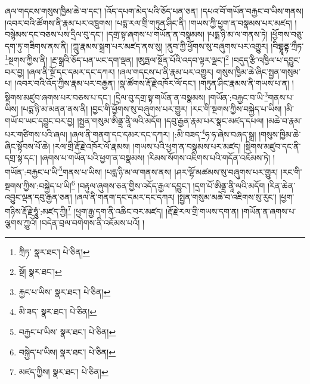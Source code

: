 ཞལ་གདངས་གསུས་ཁྱིམ་ཆེ་བ་དང་། །འོད་དཔག་མེད་པའི་ཅོད་པན་ཅན། །དཔའ་བོ་གཡོན་བརྐྱང་བ་ཡིས་གནས། །འབར་བའི་ཚོགས་ནི་རྣམ་པར་འཁྲུགས། །པདྨ་རལ་གྲི་གཏུན་ཤིང་ནི། །གཡས་ཀྱི་ཕྱག་ན་བསྣམས་པར་མཛད། །བསྙེམས་དང་བཅས་པས་དྲིལ་བུ་དང་། །དགྲ་སྟ་ཞགས་པ་གཡོན་ན་བསྣམས། །པདྨ་ཉི་མ་ལ་གནས་ཏེ། །ཕྱོགས་བཅུ་དག་ཏུ་གཟིགས་ནས་ནི། །ཀླུ་རྣམས་སྐྲག་པར་མཛད་ནས་སུ། །ནུབ་ཀྱི་ཕྱོགས་སུ་བཞུགས་པར་འགྱུར། །བིགྷྣཱནྟ་ཀྲྀཏ་\footnote{ཀྲིཏ་  སྣར་ཐང་།  པེ་ཅིན། }སྔགས་ཀྱིས་ནི། །རྔ་སྒྲའི་ཅོད་པན་ཡང་དག་ལྡན། །ཨུཏྤལ་སྔོན་པོའི་འདབ་ལྟར་ལྗང་།\footnote{སྔོ།  སྣར་ཐང་། } །བདུད་རྩི་འཁྱིལ་པ་དབྱུང་བར་བྱ། །ཞལ་ནི་སྔོ་དང་དམར་དང་དཀར། །ཞལ་གདངས་པ་ནི་རྣམ་པར་འགྱུར། གསུས་ཁྱིམ་ཆེ་ཞིང་སྤྱན་གསུམ་པ། །འབར་བའི་འོད་ཀྱིས་རྣམ་པར་བརྒྱན། །སྣ་ཚོགས་རྡོ་རྗེ་འཁོར་ལོ་དང་། །གཏུན་ཤིང་རྣམས་ནི་གཡས་པ་ན། །སྡིགས་མཛུབ་ཞགས་པར་བཅས་པ་དང་། །དྲིལ་བུ་དགྲ་སྟ་གཡོན་ན་བསྣམས། །གཡོན་:བརྐྱང་བ་ཡི་\footnote{རྐྱང་པ་ཡིས་  སྣར་ཐང་།  པེ་ཅིན། }གནས་པ་ཡིས། །པདྨ་ཉི་མ་མནན་ནས་ནི། །བྱང་གི་ཕྱོགས་སུ་བཞུགས་པར་གྱུར། །རང་གི་སྔགས་ཀྱིས་བསྐྱེད་པ་ཡིས། །མི་གཡོ་བ་ཡང་དབྱུང་བར་བྱ། །སྤྱན་གསུམ་ཨིནྡྲ་ནཱི་ལའི་མདོག །དབུ་རྒྱན་རྣམ་པར་སྣང་མཛད་དཔལ། །མཆེ་བ་རྣམ་པར་གཙིགས་པའི་ཞལ། །ཞལ་ནི་གནག་དང་དམར་དང་དཀར། །:མི་བཟད་\footnote{མི་ཟད་  སྣར་ཐང་།  པེ་ཅིན། }ཧ་ཧ་ཞེས་བཞད་སྒྲ། །གསུས་ཁྱིམ་ཆེ་ཞིང་སྟོབས་པོ་ཆེ། །རལ་གྲི་རྡོ་རྗེ་འཁོར་ལོ་རྣམས། །གཡས་པའི་ཕྱག་ན་བསྣམས་པར་མཛད། །སྡིགས་མཛུབ་དང་ནི་དགྲ་སྟ་དང་། །ཞགས་པ་གཡོན་པའི་ཕྱག་ན་བསྣམས། །རིམས་སོགས་འཇིགས་པའི་གདོན་འཇོམས་ཏེ། །གཡོན་:བརྐྱང་པ་ཡི་\footnote{བརྐྱང་པ་ཡིས་  སྣར་ཐང་།  པེ་ཅིན། }གནས་པ་ཡིས། །པདྨ་ཉི་མ་ལ་གནས་ནས། །ཤར་ལྷོ་མཚམས་སུ་བཞུགས་པར་གྱུར། །རང་གི་སྔགས་ཀྱིས་:བསྐྱེད་པ་ཡི།\footnote{བསྐྱེད་པ་ཡིས།  སྣར་ཐང་།  པེ་ཅིན། } །བརྟུལ་ཞུགས་ཅན་གྱིས་འདོད་རྒྱལ་དབྱུང་། །དྲག་པོ་ཨིནྡྲ་ནཱི་ལའི་མདོག །རིན་ཆེན་འབྱུང་ལྡན་དབུ་རྒྱན་ཅན། །ཞལ་ནི་གནག་དང་དམར་དང་དཀར། །སྤྱན་གསུམ་མཆེ་བ་འཇིགས་སུ་རུང་། །ཕྱག་གཉིས་རྡོ་རྗེ་ཧཱུཾ་:མཛད་ཀྱི།\footnote{མཛད་ཀྱིས།  སྣར་ཐང་།  པེ་ཅིན། } །ཕྱག་རྒྱ་དག་ནི་འཆིང་བར་མཛད། །རྡོ་རྗེ་རལ་གྲི་གཡས་དག་ན། །གཡོན་ན་ཞགས་པ་ལྕགས་ཀྱུའོ། །བདེན་བྲལ་བགེགས་ནི་འཇོམས་པའོ། །
